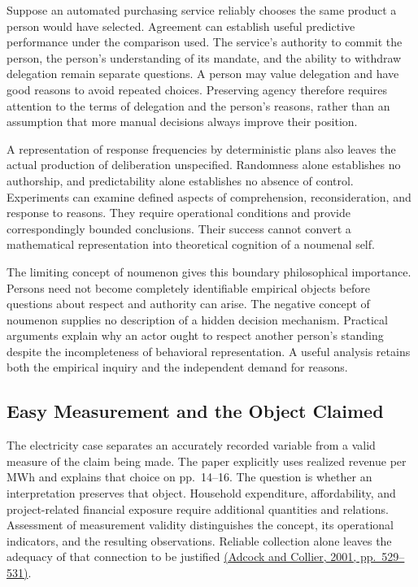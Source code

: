 \noindent \noindent Suppose an automated purchasing service reliably chooses the
same product a person would have selected. Agreement can establish
useful predictive performance under the comparison used. The service's
authority to commit the person, the person's understanding of its
mandate, and the ability to withdraw delegation remain separate
questions. A person may value delegation and have good reasons to avoid
repeated choices. Preserving agency therefore requires attention to the
terms of delegation and the person's reasons, rather than an assumption
that more manual decisions always improve their position.

A representation of response frequencies by deterministic plans also
leaves the actual production of deliberation unspecified. Randomness
alone establishes no authorship, and predictability alone establishes no
absence of control. Experiments can examine defined aspects of
comprehension, reconsideration, and response to reasons. They require
operational conditions and provide correspondingly bounded conclusions.
Their success cannot convert a mathematical representation into
theoretical cognition of a noumenal self.

The limiting concept of noumenon gives this boundary philosophical
importance. Persons need not become completely identifiable empirical
objects before questions about respect and authority can arise. The
negative concept of noumenon supplies no description of a hidden
decision mechanism. Practical arguments explain why an actor ought to
respect another person's standing despite the incompleteness of
behavioral representation. A useful analysis retains both the empirical
inquiry and the independent demand for reasons.

\hypertarget{M09-easy-measurement-and-the-object-claimed}{%
\subsection{Easy Measurement and the Object
Claimed}\label{M09-easy-measurement-and-the-object-claimed}}

\noindent \noindent The electricity case separates an accurately recorded variable
from a valid measure of the claim being made. The paper explicitly uses
realized revenue per MWh and explains that choice on pp.~14--16. The
question is whether an interpretation preserves that object. Household
expenditure, affordability, and project-related financial exposure
require additional quantities and relations. Assessment of measurement
validity distinguishes the concept, its operational indicators, and the
resulting observations. Reliable collection alone leaves the adequacy of
that connection to be justified
\href{https://doi.org/10.1017/S0003055401003100}{(Adcock and Collier,
2001, pp.~529--531)}.

